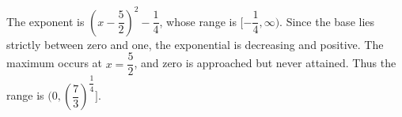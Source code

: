 The exponent is $(x-\dfrac{5}{2})^2-\dfrac{1}{4}$, whose range is $[-\dfrac{1}{4},\infty)$. Since the base lies strictly between zero and one, the exponential is decreasing and positive. The maximum occurs at $x=\dfrac{5}{2}$, and zero is approached but never attained. Thus the range is $\boxed{(0,(\dfrac{7}{3})^{\dfrac{1}{4}}]}$.
